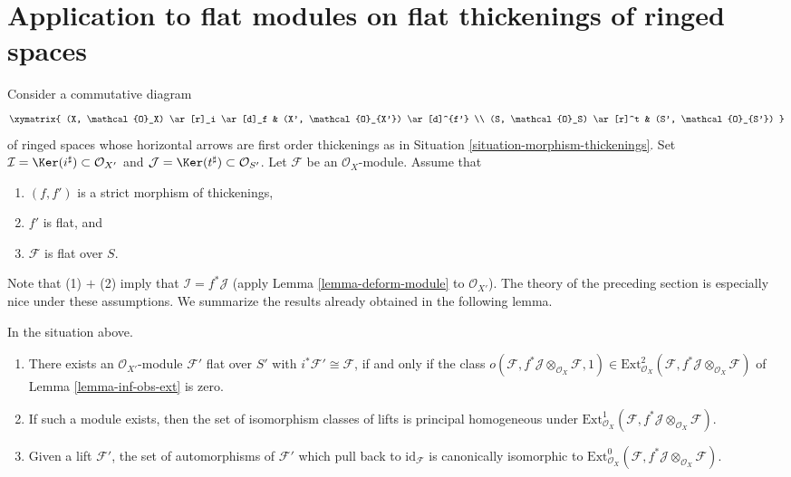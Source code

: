 \section{Application to flat modules on flat thickenings of ringed spaces}
\label{section-flat}

\noindent
Consider a commutative diagram
$$
\xymatrix{
(X, \mathcal{O}_X) \ar[r]_i \ar[d]_f & (X', \mathcal{O}_{X'}) \ar[d]^{f'} \\
(S, \mathcal{O}_S) \ar[r]^t & (S', \mathcal{O}_{S'})
}
$$
of ringed spaces whose horizontal arrows are first order thickenings as in
Situation \ref{situation-morphism-thickenings}. Set
$\mathcal{I} = \Ker(i^\sharp) \subset \mathcal{O}_{X'}$ and
$\mathcal{J} = \Ker(t^\sharp) \subset \mathcal{O}_{S'}$.
Let $\mathcal{F}$ be an $\mathcal{O}_X$-module. Assume that
\begin{enumerate}
\item $(f, f')$ is a strict morphism of thickenings,
\item $f'$ is flat, and
\item $\mathcal{F}$ is flat over $S$.
\end{enumerate}
Note that (1) $+$ (2) imply that $\mathcal{I} = f^*\mathcal{J}$
(apply Lemma \ref{lemma-deform-module} to $\mathcal{O}_{X'}$).
The theory of the preceding section is especially nice
under these assumptions. We summarize the results already obtained
in the following lemma.

\begin{lemma}
\label{lemma-flat}
In the situation above.
\begin{enumerate}
\item There exists an $\mathcal{O}_{X'}$-module $\mathcal{F}'$ flat over
$S'$ with $i^*\mathcal{F}' \cong \mathcal{F}$, if and only if
the class
$o(\mathcal{F}, f^*\mathcal{J} \otimes_{\mathcal{O}_X} \mathcal{F}, 1)
\in \text{Ext}^2_{\mathcal{O}_X}(
\mathcal{F}, f^*\mathcal{J} \otimes_{\mathcal{O}_X} \mathcal{F})$
of Lemma \ref{lemma-inf-obs-ext} is zero.
\item If such a module exists, then the set of isomorphism classes
of lifts is principal homogeneous under
$\text{Ext}^1_{\mathcal{O}_X}(
\mathcal{F}, f^*\mathcal{J} \otimes_{\mathcal{O}_X} \mathcal{F})$.
\item Given a lift $\mathcal{F}'$, the set of automorphisms of
$\mathcal{F}'$ which pull back to $\text{id}_\mathcal{F}$ is canonically
isomorphic to $\text{Ext}^0_{\mathcal{O}_X}(
\mathcal{F}, f^*\mathcal{J} \otimes_{\mathcal{O}_X} \mathcal{F})$.
\end{enumerate}
\end{lemma}

